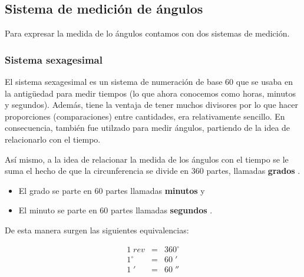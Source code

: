 \subsection{Sistema de medición de ángulos}

Para expresar la medida de lo ángulos contamos con dos sistemas de medición.

\subsubsection{Sistema sexagesimal}

El sistema sexagesimal es un sistema de numeración de base 60 que se usaba en 
la antigüedad para medir tiempos (lo que ahora conocemos como horas, minutos y
segundos). Además, tiene la ventaja de tener muchos divisores por lo que 
hacer proporciones (comparaciones) entre cantidades, era relativamente sencillo.
En consecuencia, también fue utilzado para medir ángulos, partiendo de la idea 
de relacionarlo con el tiempo.

Así mismo, a la idea de relacionar la medida de los ángulos con el tiempo se le 
suma el hecho de que la circunferencia se divide en 360 partes, llamadas 
\textbf{grados} .
\begin{itemize}
	\item El grado se parte en 60 partes llamadas \textbf{minutos}
	y
	\item El minuto se parte en 60 partes llamadas \textbf{segundos}
	.
\end{itemize}


De esta manera surgen las siguientes equivalencias:

\begin{equation*}
\boxed{
\begin{array}{rcl}	
		1\; rev &=& 360^\circ \\
		1^\circ &=& 60\;' \\
		1\;' &=& 60\;'' 
	\end{array}
}
\end{equation*}

